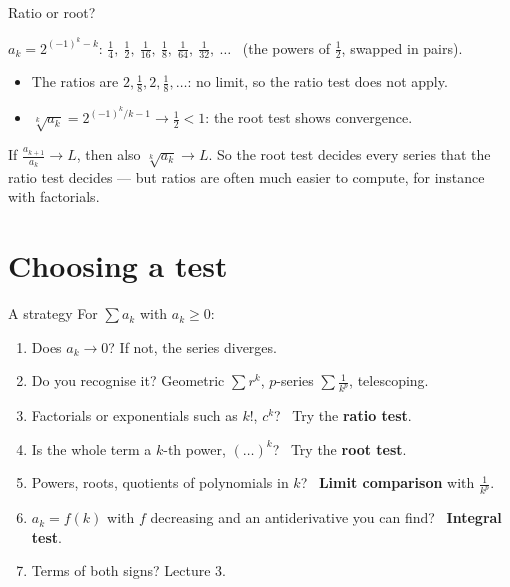 \documentclass[10pt]{wosm-slides}
\begin{document}
\begin{frame}{Ratio or root?}
  \begin{example}
    $a_k = 2^{(-1)^k - k}$: \quad
    $\frac14,\ \frac12,\ \frac1{16},\ \frac18,\ \frac1{64},\ \frac1{32},\ \dots$
    \ (the powers of $\frac12$, swapped in pairs).
    \begin{itemize}
      \item The ratios are $2, \frac18, 2, \frac18, \dots$: no limit, so the ratio test
        does not apply.
      \item $\sqrt[k]{a_k} = 2^{(-1)^k/k - 1} \to \frac12 < 1$: the root test shows
        convergence.
    \end{itemize}
  \end{example}
  \pause
  \begin{remark}
    If $\frac{a_{k+1}}{a_k} \to L$, then also $\sqrt[k]{a_k} \to L$. So the root test
    decides every series that the ratio test decides --- but ratios are often much easier
    to compute, for instance with factorials.
  \end{remark}
\end{frame}

\section{Choosing a test}

\begin{frame}{A strategy}
  For $\sum a_k$ with $a_k \ge 0$:
  \begin{enumerate}
    \item Does $a_k \to 0$? If not, the series diverges.
    \item Do you recognise it? Geometric $\sum r^k$, $p$-series $\sum \frac{1}{k^p}$,
      telescoping.
    \item Factorials or exponentials such as $k!$, $c^k$? \ Try the \textbf{ratio test}.
    \item Is the whole term a $k$-th power, $(\ldots)^k$? \ Try the \textbf{root test}.
    \item Powers, roots, quotients of polynomials in $k$? \
      \textbf{Limit comparison} with $\frac{1}{k^p}$.
    \item $a_k = f(k)$ with $f$ decreasing and an antiderivative you can find? \
      \textbf{Integral test}.
    \item Terms of both signs? Lecture 3.
  \end{enumerate}
\end{frame}
\end{document}
